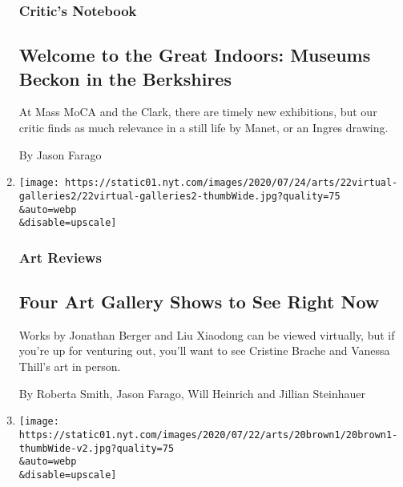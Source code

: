 \begin{enumerate}
  \hypertarget{critics-notebook-1}{%
  \subsubsection{Critic's Notebook}\label{critics-notebook-1}}

  \hypertarget{welcome-to-the-great-indoors-museums-beckon-in-the-berkshires}{%
  \subsection{Welcome to the Great Indoors: Museums Beckon in the
  Berkshires}\label{welcome-to-the-great-indoors-museums-beckon-in-the-berkshires}}

  At Mass MoCA and the Clark, there are timely new exhibitions, but our
  critic finds as much relevance in a still life by Manet, or an Ingres
  drawing.

  By Jason Farago
\item
  \href{/2020/07/22/arts/design/art-gallery-exhibitions.html}{}

  \texttt{[image: https://static01.nyt.com/images/2020/07/24/arts/22virtual-galleries2/22virtual-galleries2-thumbWide.jpg?quality=75\\\&auto=webp\\\&disable=upscale]}

  \hypertarget{art-reviews}{%
  \subsubsection{Art Reviews}\label{art-reviews}}

  \hypertarget{four-art-gallery-shows-to-see-right-now}{%
  \subsection{Four Art Gallery Shows to See Right
  Now}\label{four-art-gallery-shows-to-see-right-now}}

  Works by Jonathan Berger and Liu Xiaodong can be viewed virtually, but
  if you're up for venturing out, you'll want to see Cristine Brache and
  Vanessa Thill's art in person.

  By Roberta Smith, Jason Farago, Will Heinrich and Jillian Steinhauer
\item
  \href{/2020/07/20/arts/gavin-brown-barbara-gladstone-gallery.html}{}

  \texttt{[image: https://static01.nyt.com/images/2020/07/22/arts/20brown1/20brown1-thumbWide-v2.jpg?quality=75\\\&auto=webp\\\&disable=upscale]}

  \hypertarget{gavin-brown-closes-his-gallery-and-joins-forces-with-barbara-gladstone}{%
}
\end{enumerate}

